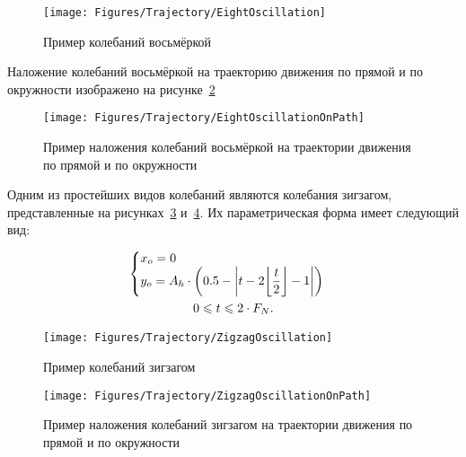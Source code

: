 \begin{figure}[H]
    \centering
    \vspace{14pt}
    \texttt{[image: Figures/Trajectory/EightOscillation]}
    \caption{Пример колебаний восьмёркой}
    \label{fig:Trajectory:EightOscillation}
\end{figure}

Наложение колебаний восьмёркой на траекторию движения по прямой и по окружности изображено на рисунке~\ref{fig:Trajectory:EightOscillationOnPath}

\begin{figure}[H]
    \centering
    \vspace{14pt}
    \texttt{[image: Figures/Trajectory/EightOscillationOnPath]}
    \caption{Пример наложения колебаний восьмёркой на траектории движения по прямой и по окружности}
    \label{fig:Trajectory:EightOscillationOnPath}
\end{figure}

Одним из простейших видов колебаний являются колебания зигзагом, представленные на рисунках~\ref{fig:Trajectory:ZigzagOscillation} и~\ref{fig:Trajectory:ZigzagOscillationOnPath}.
Их параметрическая форма имеет следующий вид:

\begin{gather*}
    \begin{cases}
        \begin{aligned}
            &x_o = 0 \\
            &y_o = A_h \cdot \left( 0.5 - \left| t - 2 \floor*{\dfrac{t}{2}} - 1 \right| \right)
        \end{aligned}
    \end{cases} \\
    0 \leq t \leq 2 \cdot F_N.
\end{gather*}

\begin{figure}[H]
    \centering
    \vspace{14pt}
    \texttt{[image: Figures/Trajectory/ZigzagOscillation]}
    \caption{Пример колебаний зигзагом}
    \label{fig:Trajectory:ZigzagOscillation}
\end{figure}

\begin{figure}[H]
    \centering
    \vspace{14pt}
    \texttt{[image: Figures/Trajectory/ZigzagOscillationOnPath]}
    \caption{Пример наложения колебаний зигзагом на траектории движения по прямой и по окружности}
    \label{fig:Trajectory:ZigzagOscillationOnPath}
\end{figure}
